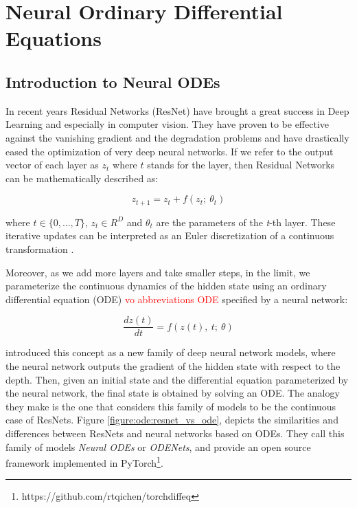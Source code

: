 \chapter{Neural Ordinary Differential Equations}
\label{chapter:ode}

\section{Introduction to Neural ODEs}
\label{section:ode:introduction}

In recent years Residual Networks (ResNet) \citep{he2016deep} have brought a great success in Deep Learning and especially in computer vision. They have proven to be effective against the vanishing gradient and the degradation problems and have drastically eased the optimization of very deep neural networks. If we refer to the output vector of each layer as $ z_t $ where $ t $ stands for the layer, then Residual Networks can be mathematically described as:

\begin{equation}
    \label{equation:ode:resnet}
    z_{t+1} = z_{t} + f(z_{t}; \ \theta_{t})
\end{equation}

where $ t \in \{0, ..., T\} $, $ z_t \in R^D $ and $ \theta_t $ are the parameters of the \emph{t}-th layer. These iterative updates can be interpreted as an Euler discretization of a continuous transformation \citep{lu2017beyond, haber2017stable, ruthotto2018deep}.

Moreover, as we add more layers and take smaller steps, in the limit, we parameterize the continuous dynamics of the hidden state using an ordinary differential equation (ODE) \textcolor{red}{vo abbreviations ODE} specified by a neural network:

\begin{equation}
    \label{equation:ode:odes}
    \frac{d z(t)}{d t} = f(z(t), \ t; \ \theta )
\end{equation}

\citet{chen2018neural} introduced this concept as a new family of deep neural network models, where the neural network outputs the gradient of the hidden state with respect to the depth. Then, given an initial state and the differential equation parameterized by the neural network, the final state is obtained by solving an ODE. The analogy they make is the one that considers this family of models to be the continuous case of ResNets. Figure \ref{figure:ode:resnet_vs_ode}, depicts the similarities and differences between ResNets and neural networks based on ODEs. They call this family of models \emph{Neural ODEs} or \emph{ODENets}, and provide an open source framework implemented in PyTorch\footnote{https://github.com/rtqichen/torchdiffeq}.

